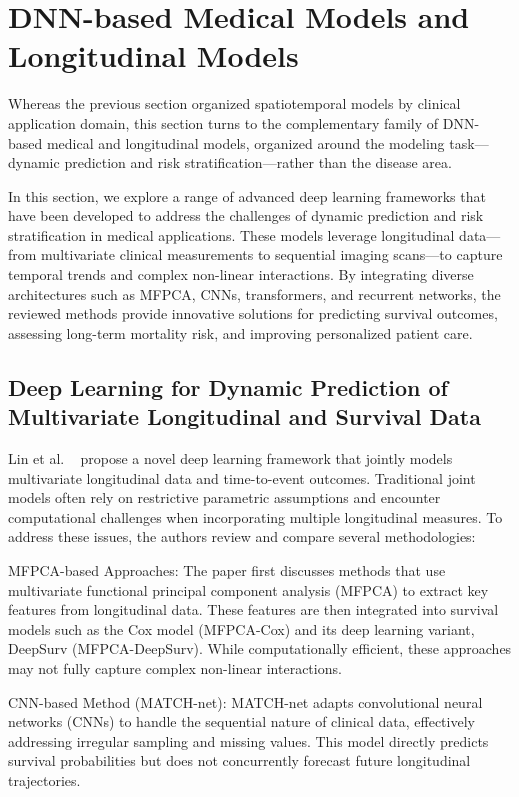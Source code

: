\documentclass[acmsmall]{acmart}
\begin{document}
\section{ DNN-based Medical Models and Longitudinal Models}
\label{sec:categorization}
Whereas the previous section organized spatiotemporal models by clinical application domain, this section turns to the complementary family of DNN-based medical and longitudinal models, organized around the modeling task---dynamic prediction and risk stratification---rather than the disease area.

In this section, we explore a range of advanced deep learning frameworks that have been developed to address the challenges of dynamic prediction and risk stratification in medical applications. These models leverage longitudinal data—from multivariate clinical measurements to sequential imaging scans—to capture temporal trends and complex non-linear interactions. By integrating diverse architectures such as MFPCA, CNNs, transformers, and recurrent networks, the reviewed methods provide innovative solutions for predicting survival outcomes, assessing long-term mortality risk, and improving personalized patient care.

\subsection{Deep Learning for Dynamic Prediction of Multivariate Longitudinal and Survival Data}
Lin et al. ~\cite{lin2022deep} propose a novel deep learning framework that jointly models multivariate longitudinal data and time-to-event outcomes. Traditional joint models often rely on restrictive parametric assumptions and encounter computational challenges when incorporating multiple longitudinal measures. To address these issues, the authors review and compare several methodologies:

MFPCA-based Approaches:
    The paper first discusses methods that use multivariate functional principal component analysis (MFPCA) to extract key features from longitudinal data. These features are then integrated into survival models such as the Cox model (MFPCA-Cox) and its deep learning variant, DeepSurv (MFPCA-DeepSurv). While computationally efficient, these approaches may not fully capture complex non-linear interactions.
    
CNN-based Method (MATCH-net): 
    MATCH-net adapts convolutional neural networks (CNNs) to handle the sequential nature of clinical data, effectively addressing irregular sampling and missing values. This model directly predicts survival probabilities but does not concurrently forecast future longitudinal trajectories.
    
\end{document}
